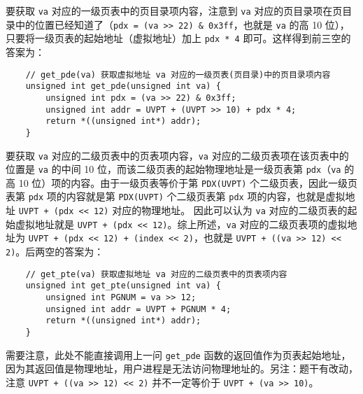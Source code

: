 \begin{problems}
        要获取 \verb|va| 对应的一级页表中的页目录项内容，注意到 \verb|va| 对应的页目录项在页目录中的位置已经知道了（\verb|pdx = (va >> 22) & 0x3ff|，也就是 \verb|va| 的高 10 位），只要将一级页表的起始地址（虚拟地址）加上 \verb|pdx * 4| 即可。这样得到前三空的答案为：
        \begin{verbatim}
    // get_pde(va) 获取虚拟地址 va 对应的一级页表(页目录)中的页目录项内容
    unsigned int get_pde(unsigned int va) {
        unsigned int pdx = (va >> 22) & 0x3ff;
        unsigned int addr = UVPT + (UVPT >> 10) + pdx * 4;
        return *((unsigned int*) addr);
    }
        \end{verbatim}

        要获取 \verb|va| 对应的二级页表中的页表项内容，\verb|va| 对应的二级页表项在该页表中的位置是 \verb|va| 的中间 10 位，而该二级页表的起始物理地址是一级页表第 \verb|pdx|（\verb|va| 的高 10 位）项的内容。由于一级页表等价于第 \verb|PDX(UVPT)| 个二级页表，因此一级页表第 \verb|pdx| 项的内容就是第 \verb|PDX(UVPT)| 个二级页表第 \verb|pdx| 项的内容，也就是虚拟地址 \verb|UVPT + (pdx << 12)| 对应的物理地址。 因此可以认为 \verb|va| 对应的二级页表的起始虚拟地址就是 \verb|UVPT + (pdx << 12)|。综上所述，\verb|va| 对应的二级页表项的虚拟地址为 \verb|UVPT + (pdx << 12) + (index << 2)|，也就是 \verb|UVPT + ((va >> 12) << 2)|。后两空的答案为：
        \begin{verbatim}
    // get_pte(va) 获取虚拟地址 va 对应的二级页表中的页表项内容
    unsigned int get_pte(unsigned int va) {
        unsigned int PGNUM = va >> 12;
        unsigned int addr = UVPT + PGNUM * 4;
        return *((unsigned int*) addr);
    }
        \end{verbatim}
        
        需要注意，此处不能直接调用上一问 \verb|get_pde| 函数的返回值作为页表起始地址，因为其返回值是物理地址，用户进程是无法访问物理地址的。另注：题干有改动，注意 \verb|UVPT + ((va >> 12) << 2)| 并不一定等价于 \verb|UVPT + (va >> 10)|。
    \end{problems}